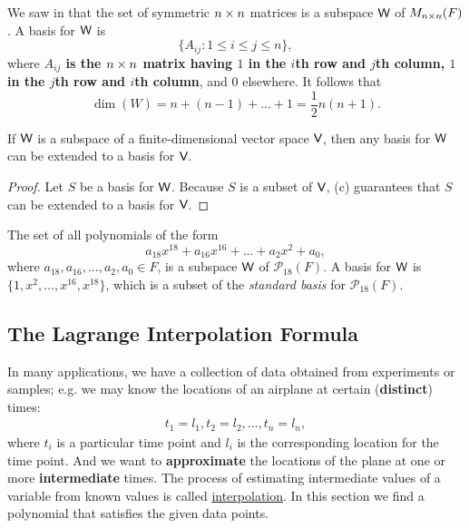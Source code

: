 \begin{example} \label{example 1.6.20}
We saw in  that the set of symmetric \(n \times n\) matrices is a subspace \(\textsf{W}\) of \(M_{n \times n}(F)\).
A basis for \(\textsf{W}\) is
\[
    \{ A_{ij} : 1 \le i \le j \le n \},
\]
where \textbf{\(A_{ij}\) is the \(n \times n\) matrix having \(1\) in the \(i\)th row and \(j\)th column, \(1\) in the \(j\)th row and \(i\)th column}, and \(0\) elsewhere.
It follows that
\[
    \dim(W) = n + (n - 1) + ... + 1 = \frac{1}{2}n(n + 1). 
\]
\end{example}

\begin{corollary} \label{corollary 1.11.1}
If \(\textsf{W}\) is a subspace of a finite-dimensional vector space \(\textsf{V}\), then any basis for \(\textsf{W}\) can be extended to a basis for \(\textsf{V}\).
\end{corollary}

\begin{proof}
Let \(S\) be a basis for \(\textsf{W}\).
Because \(S\) is a \LID{} subset of \(\textsf{V}\), (c) guarantees that \(S\) can be extended to a basis for \(\textsf{V}\).
\end{proof}

\begin{example} \label{example 1.6.21}
The set of all polynomials of the form
\[
    a_{18} x^{18} + a_{16} x^{16} + ... + a_2 x^2 + a_0,
\]
where \(a_{18}, a_{16}, ..., a_2, a_0 \in F\), is a subspace \(\textsf{W}\) of \(\mathcal{P}_{18}(F)\).
A basis for \(\textsf{W}\) is \(\{ 1, x^2, ..., x^{16}, x^{18} \}\), which is a subset of the \emph{standard basis} for \(\mathcal{P}_{18}(F)\).
\end{example}

\subsection{The Lagrange Interpolation Formula}
In many applications, we have a collection of data obtained from experiments or samples;
e.g. we may know the locations of an airplane at certain (\textbf{distinct}) times:
\begin{align*}
    t_1 = l_1,
    t_2 = l_2,
    ...,
    t_n = l_n,
\end{align*}
where \(t_i\) is a particular time point and \(l_i\) is the corresponding location for the time point.
And we want to \textbf{approximate} the locations of the plane at one or more \textbf{intermediate} times.
The process of estimating intermediate values of a variable from known values is called \href{https://www.wikiwand.com/en/Interpolation}{interpolation}.
In this section we find a polynomial that satisfies the given data points.

